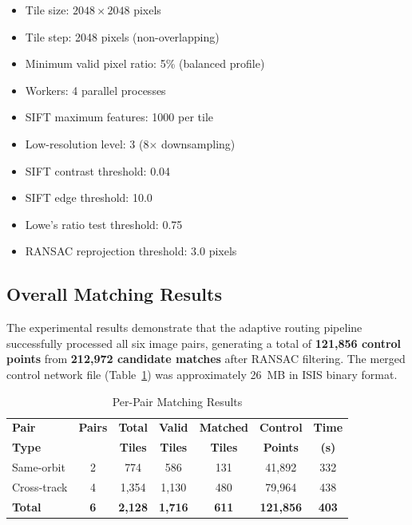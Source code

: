 \documentclass[lettersize,journal]{IEEEtran}
\begin{document}
\begin{itemize}
    \item Tile size: $2048 \times 2048$ pixels
    \item Tile step: 2048 pixels (non-overlapping)
    \item Minimum valid pixel ratio: 5\% (balanced profile)
    \item Workers: 4 parallel processes
    \item SIFT maximum features: 1000 per tile
    \item Low-resolution level: 3 (8$\times$ downsampling)
    \item SIFT contrast threshold: 0.04
    \item SIFT edge threshold: 10.0
    \item Lowe's ratio test threshold: 0.75
    \item RANSAC reprojection threshold: 3.0 pixels
\end{itemize}

\subsection{Overall Matching Results}

The experimental results demonstrate that the adaptive routing pipeline successfully processed all six image pairs, generating a total of \textbf{121,856 control points} from \textbf{212,972 candidate matches} after RANSAC filtering. The merged control network file (Table~\ref{tab:results}) was approximately 26~MB in ISIS binary format.

\begin{table}[htbp]
\caption{Per-Pair Matching Results}
\label{tab:results}
\centering
\begin{tabular}{@{}lcccccc@{}}
\toprule
\textbf{Pair} & \textbf{Pairs} & \textbf{Total} & \textbf{Valid} & \textbf{Matched} & \textbf{Control} & \textbf{Time} \\
\textbf{Type} &  & \textbf{Tiles} & \textbf{Tiles} & \textbf{Tiles} & \textbf{Points} & \textbf{(s)} \\
\midrule
Same-orbit & 2 & 774 & 586 & 131 & 41,892 & 332 \\
Cross-track & 4 & 1,354 & 1,130 & 480 & 79,964 & 438 \\
\textbf{Total} & \textbf{6} & \textbf{2,128} & \textbf{1,716} & \textbf{611} & \textbf{121,856} & \textbf{403} \\
\bottomrule
\end{tabular}
\end{table}
\end{document}
